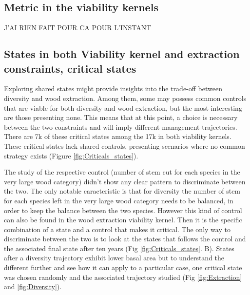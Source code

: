 \documentclass{article}
\begin{document}
\subsection{Metric in the viability kernels}

J'AI RIEN FAIT POUR CA POUR L'INSTANT\\

\subsection{States in both Viability kernel and extraction constraints, critical states}

Exploring shared states might provide insights into the trade-off between diversity and wood extraction. Among them, some may possess common controls that are viable for both diversity and wood extraction, but the most interesting are those presenting none. This means that at this point, a choice is necessary between the two constraints and will imply different management trajectories. There are 7k of these critical states among the 17k in both viability kernels. These critical states lack shared controls, presenting scenarios where no common strategy exists (Figure \ref{fig:Criticals_states}).

The study of the respective control (number of stem cut for each species in the very large wood category) didn't show any clear pattern to discriminate between the two. The only notable caracteristic is that for diversity the number of stem for each species left in the very large wood category needs to be balanced, in order to keep the balance between the two species. However this kind of control can also be found in the wood extraction viability kernel. Then it is the specific combination of a state and a control that makes it critical. The only way to discriminate between the two is to look at the states that follows the control and the associated final state after ten years (Fig \ref{fig:Criticals_states}. B). States after a diversity trajectory exhibit lower basal area but to understand the different further and see how it can apply to a particular case, one critical state was chosen randomly and the associated trajectory studied (Fig \ref{fig:Extraction} and \ref{fig:Diversity}).
\end{document}
